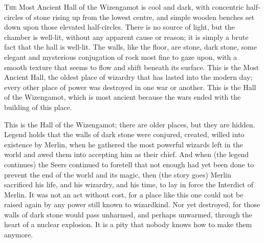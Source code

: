 
\lettrine{T}{he} Most Ancient Hall of the Wizengamot is cool and dark, with concentric half-circles of stone rising up from the lowest centre, and simple wooden benches set down upon those elevated half-circles. There is no source of light, but the chamber is well-lit, without any apparent cause or reason; it is simply a brute fact that the hall is well-lit. The walls, like the floor, are stone, dark stone, some elegant and mysterious conjugation of rock most fine to gaze upon, with a smooth texture that seems to flow and shift beneath its surface. This is the Most Ancient Hall, the oldest place of wizardry that has lasted into the modern day; every other place of power was destroyed in one war or another. This is the Hall of the Wizengamot, which is most ancient because the wars ended with the building of this place.

This is the Hall of the Wizengamot; there are older places, but they are hidden. Legend holds that the walls of dark stone were conjured, created, willed into existence by Merlin, when he gathered the most powerful wizards left in the world and awed them into accepting him as their chief. And when (the legend continues) the Seers continued to foretell that not enough had yet been done to prevent the end of the world and its magic, then (the story goes) Merlin sacrificed his life, and his wizardry, and his time, to lay in force the Interdict of Merlin. It was not an act without cost, for a place like this one could not be raised again by any power still known to wizardkind. Nor yet destroyed, for those walls of dark stone would pass unharmed, and perhaps unwarmed, through the heart of a nuclear explosion. It is a pity that nobody knows how to make them anymore.

